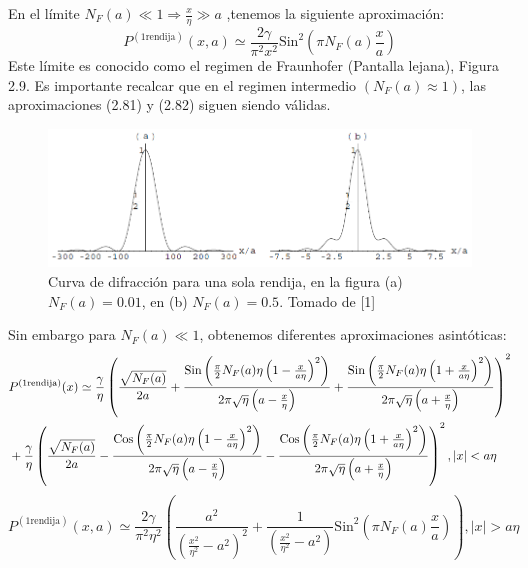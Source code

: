 En el límite $N_F(a)\ll 1\Rightarrow \frac{x}{\eta}\gg a$ ,tenemos la siguiente aproximación:
\begin{equation}
P^{(\text{1rendija})}(x,a)\simeq\frac{2\gamma}{\pi^{2}x^{2}}\text{Sin}^{2}\left(\pi N_{F}(a)\frac{x}{a}\right)
\end{equation}
Este límite es conocido como el regimen de Fraunhofer (Pantalla lejana), Figura 2.9. Es importante recalcar que en el regimen intermedio $(N_F(a)\approx 1)$, las aproximaciones (2.81) y (2.82) siguen siendo válidas.
\begin{figure}[h]
\centering
\includegraphics[width=13cm]{Imagenes/Fig9}
\caption[Patron de interferencia, 1 rendija, regimen de Fraunhofer]{Curva de difracción para una sola rendija, en la figura (a) $N_F(a)=0.01$, en (b) $N_F(a)=0.5$. Tomado de [1]}
\end{figure}
Sin embargo para $N_F(a)\ll 1$, obtenemos diferentes aproximaciones asintóticas:
\begin{eqnarray}
\nonumber &P^{(\text{1rendija})}(x)\simeq\frac{\gamma}{\eta}\left(\frac{\sqrt{N_{F}(a)}}{2a}+\frac{\text{\text{Sin}}\left(\frac{\pi}{2}N_{F}(a)\eta\left(1-\frac{x}{a\eta}\right)^{2}\right)}{2\pi\sqrt{\eta}\left(a-\frac{x}{\eta}\right)}+\frac{\text{\text{Sin}}\left(\frac{\pi}{2}N_{F}(a)\eta\left(1+\frac{x}{a\eta}\right)^{2}\right)}{2\pi\sqrt{\eta}\left(a+\frac{x}{\eta}\right)}\right)^{2}\\
&+\frac{\gamma}{\eta}\left(\frac{\sqrt{N_{F}(a)}}{2a}-\frac{\text{\text{Cos}}\left(\frac{\pi}{2}N_{F}(a)\eta\left(1-\frac{x}{a\eta}\right)^{2}\right)}{2\pi\sqrt{\eta}\left(a-\frac{x}{\eta}\right)}-\frac{\text{\text{Cos}}\left(\frac{\pi}{2}N_{F}(a)\eta\left(1+\frac{x}{a\eta}\right)^{2}\right)}{2\pi\sqrt{\eta}\left(a+\frac{x}{\eta}\right)}\right)^{2},|x|<a\eta
\end{eqnarray}
\begin{equation}
P^{(\text{1rendija})}(x,a)\simeq\frac{2\gamma}{\pi^{2}\eta^{2}}\left(\frac{a^{2}}{\left(\frac{x^{2}}{\eta^{2}}-a^{2}\right)^{2}}+\frac{1}{\left(\frac{x^{2}}{\eta^{2}}-a^{2}\right)}\text{Sin}^{2}\left(\pi N_{F}(a)\frac{x}{a}\right)\right), |x|>a\eta
\end{equation}

